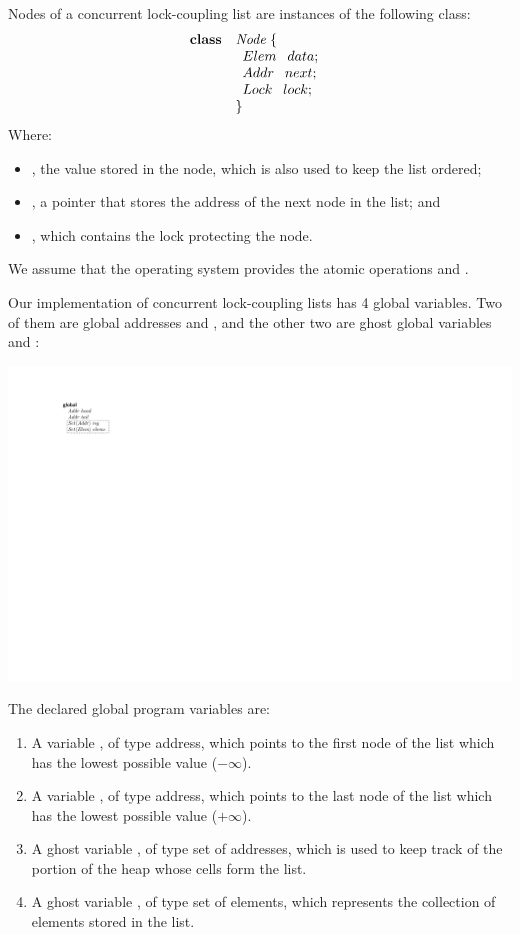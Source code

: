 %
Nodes of a concurrent lock-coupling list are instances of the following 
\ListNode class:
%
\[
  \begin{array}{ll}
	  \textbf{class} & \mathit{Node}  \;\{\\
	  		&\begin{array}{l}
				Elem \:\;\; data; \;\\
				Addr \:\;\; next; \;\\
				Lock \:\;\; lock; \;
			\end{array}\\
		&\}
  \end{array}
\]
%
Where:
\begin{itemize}
		\item \fData, the value stored in the node, which is also used to keep 
			the list ordered;
		\item \fNext, a pointer that stores the address of the next node in 
			the list; and
		\item \fLock, which contains the lock protecting the node.
\end{itemize}

We assume that the operating system provides the atomic operations \fLock 
and \fUnlock. 


Our implementation of concurrent lock-coupling lists has 4 global variables. Two of them are
global addresses \head and \tail, and the other two are ghost global variables \region 
and \elements:
%
\begin{center}
	\includegraphics[scale=\figscale]{graphics/_lists_classes}
\end{center}
%
The declared global program variables are:
%
\begin{enumerate}
		\item A variable \head, of type address, which points to the 
			first node of the list which has the lowest possible value ($-\infty$).
		\item A variable \tail, of type address, which points to the 
			last node of the list  which has the lowest possible value ($+\infty$).
		\item A ghost variable \region, of type set of addresses, which is 
			used to keep track of the portion of the heap whose cells form the 
			list.
		\item A ghost variable \elements, of type set of elements, which 
			represents the collection of elements stored in the list.
\end{enumerate}


